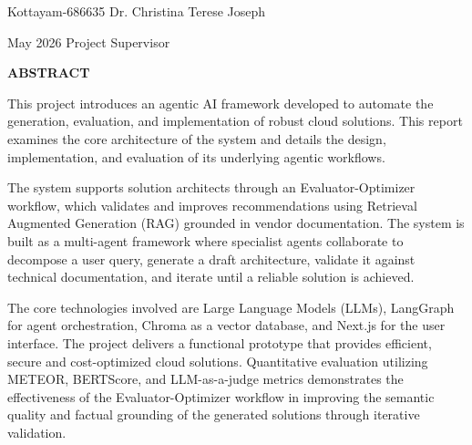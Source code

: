 \documentclass[12pt,a4wide]{report}
\theoremstyle{plain}
\theoremstyle{definition}
\theoremstyle{remark}
\begin{document}
\vspace{4cm}

\noindent Kottayam-686635  \hfill Dr. Christina Terese Joseph

\noindent May 2026 \hfill Project Supervisor

\clearpage






\begin{center}
{\Large{\bf{ABSTRACT}}}
\end{center}



This project introduces an agentic AI framework developed to automate the generation, evaluation, and implementation of robust cloud solutions. This report examines the core architecture of the system and details the design, implementation, and evaluation of its underlying agentic workflows.

The system supports solution architects through an Evaluator-Optimizer workflow, which validates and improves recommendations using Retrieval Augmented Generation (RAG) grounded in vendor documentation. The system is built as a multi-agent framework where specialist agents collaborate to decompose a user query, generate a draft architecture, validate it against technical documentation, and iterate until a reliable solution is achieved.

The core technologies involved are Large Language Models (LLMs), LangGraph for agent orchestration, Chroma as a vector database, and Next.js for the user interface. The project delivers a functional prototype that provides efficient, secure and cost-optimized cloud solutions. Quantitative evaluation utilizing METEOR, BERTScore, and LLM-as-a-judge metrics demonstrates the effectiveness of the Evaluator-Optimizer workflow in improving the semantic quality and factual grounding of the generated solutions through iterative validation.

\clearpage



\tableofcontents
\clearpage
\listoffigures
\listoftables


\newpage

\setcounter{page}{1}














\nocite{golub} \nocite{gerla}\nocite{m1}\nocite{chang}


\end{document}

